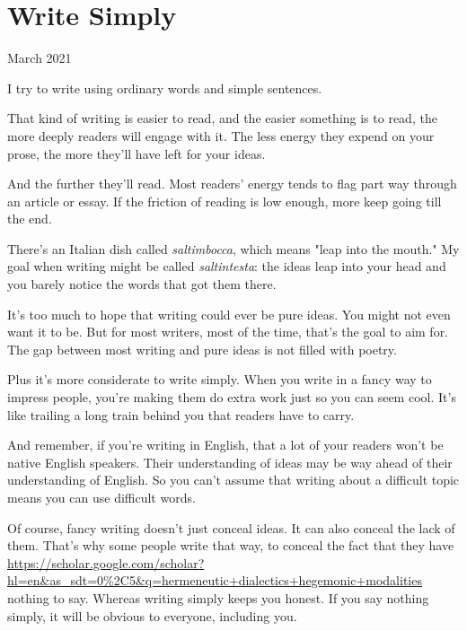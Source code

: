 \chapter{Write Simply}


            
              
                

March 2021

I try to write using ordinary words and
                  simple sentences.

That kind of writing is easier to
                  read, and the easier something is to read, the more deeply
                  readers will engage with it. The less energy they expend on
                  your prose, the more they'll have left for your ideas.

And
                  the further they'll read. Most readers' energy tends to flag
                  part way through an article or essay. If the friction of
                  reading is low enough, more keep going till the end.

There's
                  an Italian dish called \emph{saltimbocca}, which means "leap
                  into the mouth." My goal when writing might be called
                  \emph{saltintesta}: the ideas leap into your head and you
                  barely notice the words that got them there.

It's
                  too much to hope that writing could ever be pure ideas. You
                  might not even want it to be. But for most writers, most of
                  the time, that's the goal to aim for. The gap between most
                  writing and pure ideas is not filled with poetry.

Plus
                  it's more considerate to write simply. When you write in a
                  fancy way to impress people, you're making them do extra work
                  just so you can seem cool. It's like trailing a long train
                  behind you that readers have to carry.

And
                  remember, if you're writing in English, that a lot of your
                  readers won't be native English speakers. Their understanding
                  of ideas may be way ahead of their understanding of English.
                  So you can't assume that writing about a difficult topic means
                  you can use difficult words.

Of course, fancy
                  writing doesn't just conceal ideas. It can also conceal the
                  lack of them. That's why some people write that way, to
                  conceal the fact that they have
                  \href{https://scholar.google.com/scholar?hl=en\&as\_sdt=0\%2C5\&q=hermeneutic+dialectics+hegemonic+modalities}{https://scholar.google.com/scholar?hl=en\&as\_sdt=0\%2C5\&q=hermeneutic+dialectics+hegemonic+modalities}
                  nothing to say. Whereas writing simply keeps you honest. If
                  you say nothing simply, it will be obvious to everyone,
                  including you.

